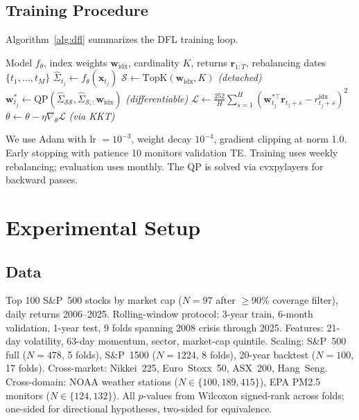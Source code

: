 \documentclass[letterpaper]{article}
\newcommand{\bw}{\mathbf{w}}
\newcommand{\br}{\mathbf{r}}
\newcommand{\bx}{\mathbf{x}}
\newcommand{\bSigma}{\hat{\Sigma}}
\newcommand{\cS}{\mathcal{S}}
\newcommand{\cL}{\mathcal{L}}
\begin{document}
\subsection{Training Procedure}

Algorithm~\ref{alg:dfl} summarizes the DFL training loop.

\begin{algorithm}[t]
\caption{DFL Training for Sparse Index Tracking}
\label{alg:dfl}
\begin{algorithmic}[1]
\REQUIRE Model $f_\theta$, index weights $\bw_{\text{idx}}$, cardinality $K$, returns $\br_{1:T}$, rebalancing dates $\{t_1, \dots, t_M\}$
    \STATE $\bSigma_{t_j} \leftarrow f_\theta(\bx_{t_j})$
    \STATE $\cS \leftarrow \text{TopK}(\bw_{\text{idx}}, K)$ \hfill {\footnotesize\textit{(detached)}}
    \STATE $\bw^*_{t_j} \leftarrow \text{QP}(\bSigma_{\cS\cS}, \bSigma_{\cS,:}\bw_{\text{idx}})$ \hfill {\footnotesize\textit{(differentiable)}}
    \STATE $\cL \leftarrow \frac{252}{H}\sum_{s=1}^{H}(\bw^{*\top}_{t_j} \br_{t_j+s} - r^{\text{idx}}_{t_j+s})^2$
  \ENDFOR
  \STATE $\theta \leftarrow \theta - \eta \nabla_\theta \cL$ \hfill {\footnotesize\textit{(via KKT)}}
\ENDFOR
\end{algorithmic}
\end{algorithm}

We use Adam with lr $= 10^{-3}$, weight decay $10^{-4}$, gradient clipping at norm 1.0. Early stopping with patience 10 monitors validation TE. Training uses weekly rebalancing; evaluation uses monthly. The QP is solved via cvxpylayers \citep{agrawal2019differentiable} for backward passes.

\section{Experimental Setup}

\subsection{Data}

Top 100 S\&P~500 stocks by market cap ($N{=}97$ after ${\geq}90\%$ coverage filter), daily returns 2006--2025. Rolling-window protocol: 3-year train, 6-month validation, 1-year test, 9 folds spanning 2008 crisis through 2025. Features: 21-day volatility, 63-day momentum, sector, market-cap quintile. Scaling: S\&P~500 full ($N{=}478$, 5 folds), S\&P~1500 ($N{=}1224$, 8 folds), 20-year backtest ($N{=}100$, 17 folds). Cross-market: Nikkei~225, Euro~Stoxx~50, ASX~200, Hang~Seng. Cross-domain: NOAA weather stations ($N{\in}\{100, 189, 415\}$), EPA PM2.5 monitors ($N{\in}\{124, 132\}$). All $p$-values from Wilcoxon signed-rank across folds; one-sided for directional hypotheses, two-sided for equivalence.
\end{document}

